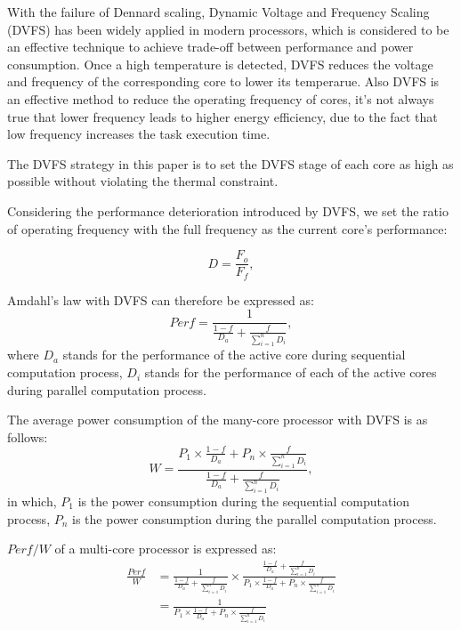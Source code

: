 With the failure of Dennard scaling, Dynamic Voltage and Frequency Scaling (DVFS) has been widely applied in modern processors, which is considered to be an effective technique to achieve trade-off between performance and power consumption. Once a high temperature is detected, DVFS reduces the voltage and frequency of the corresponding core to lower its temperarue. Also DVFS is an effective method to reduce the operating frequency of cores, it's not always true that lower frequency leads to higher energy efficiency, due to the fact that low frequency increases the task execution time.

The DVFS strategy in this paper is to set the DVFS stage of each core as high as possible without violating the thermal constraint.

Considering the performance deterioration introduced by DVFS, we set the ratio of operating frequency with the full frequency as the current core's performance:

\begin{equation}\label{performance_per_core}
D = \frac{F_{o}}{F_{f}},
\end{equation}

Amdahl's law with DVFS can therefore be expressed as:
\begin{equation}\label{speedup}
Perf = \frac{1} {\frac{1-f}{D_{a}}+\frac{f}{\sum_{i=1}^{n}D_{i}}},
\end{equation}
where $D_{a}$ stands for the performance of the active core during sequential computation process, $D_{i}$ stands for the performance of each of the active cores during parallel computation process.

The average power consumption of the many-core processor with DVFS is as follows:
\begin{equation}\label{average_power}
W = \frac{P_{1} \times \frac{1-f}{D_{a}}+P_{n} \times \frac{f}{\sum_{i=1}^{n}D_{i}}}{\frac{1-f}{D_{a}}+\frac{f}{\sum_{i=1}^{n}D_{i}}},
\end{equation}
in which, $P_{1}$ is the power consumption during the sequential computation process, $P_{n}$ is the power consumption during the parallel computation process.

$Perf/W$ of a multi-core processor is expressed as:
\begin{equation}\label{ppw}
\begin{split}
\frac{Perf}{W} &= \frac{1} {\frac{1-f}{D_{a}}+\frac{f}{\sum_{i=1}^{n}D_{i}}} \times \frac{\frac{1-f}{D_{a}}+\frac{f}{\sum_{i=1}^{n}D_{i}}}{P_{1} \times \frac{1-f}{D_{a}}+P_{n} \times \frac{f}{\sum_{i=1}^{n}D_{i}}}\\
&= \frac{1}{P_{1} \times \frac{1-f}{D_{a}}+P_{n} \times \frac{f}{\sum_{i=1}^{n}D_{i}}}
\end{split}
\end{equation}

